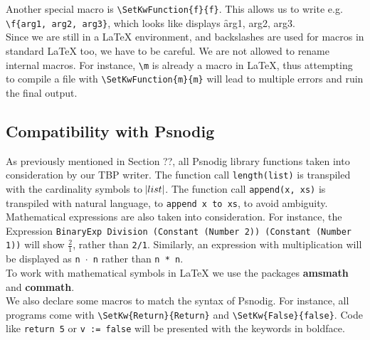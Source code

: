 Another special macro is \texttt{\textbackslash SetKwFunction\{f\}\{f\}}. This allows us to write e.g. \texttt{\textbackslash f\{arg1, arg2, arg3\}}, which looks like displays \f{arg1, arg2, arg3}. \hfill \\

Since we are still in a LaTeX environment, and backslashes are used for macros in standard LaTeX too, we have to be careful. We are not allowed to rename internal macros. For instance, \texttt{\textbackslash m} is already a macro in LaTeX, thus attempting to compile a file with \texttt{\textbackslash SetKwFunction\{m\}\{m\}} will lead to multiple errors and ruin the final output.

\subsection{Compatibility with Psnodig}

As previously mentioned in Section ??, all Psnodig library functions taken into consideration by our TBP writer. The function call \texttt{length(list)} is transpiled with the cardinality symbols to $\abs{list}$. The function call \texttt{append(x, xs)} is transpiled with natural language, to \texttt{append x to xs}, to avoid ambiguity. \\

Mathematical expressions are also taken into consideration. For instance, the Expression \texttt{BinaryExp Division (Constant (Number 2)) (Constant (Number 1))} will show $\frac{2}{1}$, rather than \texttt{2/1}. Similarly, an expression with multiplication will be displayed as \texttt{n $\cdot$ n} rather than \texttt{n * n}. \\

To work with mathematical symbols in LaTeX we use the packages \textbf{amsmath} and \textbf{commath}. \\

We also declare some macros to match the syntax of Psnodig. For instance, all programs come with \texttt{\textbackslash SetKw\{Return\}\{Return\}} and \texttt{\textbackslash SetKw\{False\}\{false\}}. Code like \texttt{return 5} or \texttt{v := false} will be presented with the keywords in boldface. \\



